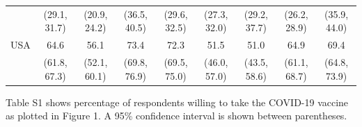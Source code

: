 \documentclass[
  12pt,
]{article}
\begin{document}
\begin{table}[!h]
{\begin{threeparttable}
\begin{tabular}[t]{lcccccccc}
 & (29.1, 31.7) & (20.9, 24.2) & (36.5, 40.5) & (29.6, 32.5) & (27.3, 32.0) & (29.2, 37.7) & (26.2, 28.9) & (35.9, 44.0)\\
USA & 64.6 & 56.1 & 73.4 & 72.3 & 51.5 & 51.0 & 64.9 & 69.4\\
 & (61.8, 67.3) & (52.1, 60.1) & (69.8, 76.9) & (69.5, 75.0) & (46.0, 57.0) & (43.5, 58.6) & (61.1, 68.7) & (64.8, 73.9)\\
\bottomrule
\end{tabular}
\begin{tablenotes}
\item Table S1 shows percentage of respondents willing to take the COVID-19 vaccine as plotted in Figure 1. A 95\% confidence interval is shown between parentheses.
\end{tablenotes}
\end{threeparttable}}
\end{table}

\newpage
\end{document}
